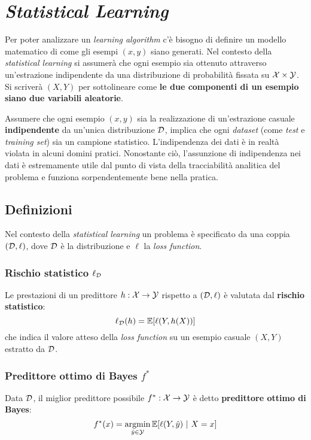 \section{\textit{Statistical Learning}}

Per poter analizzare un \textit{learning algorithm} c'è bisogno di definire un 
modello matematico di come gli esempi $(x,y)$ siano generati. Nel contesto della
\textit{statistical learning} si assumerà che ogni esempio sia ottenuto attraverso
un'estrazione indipendente da una distribuzione di probabilità fissata su
$\mathcal{X} \times \mathcal{Y}$. Si scriverà $(X,Y)$ per sottolineare come 
\textbf{le due componenti di un esempio siano due variabili aleatorie}.

Assumere che ogni esempio $(x,y)$ sia la realizzazione di un'estrazione casuale 
\textbf{indipendente} da un'unica distribuzione $\mathcal{D}$, implica che ogni 
\textit{dataset} (come \textit{test} e \textit{training set}) sia un campione
statistico. L'indipendenza dei dati è in realtà violata in alcuni domini pratici.
Nonostante ciò, l'assunzione di indipendenza nei dati è estremamente utile dal
punto di vista della tracciabilità analitica del problema e funziona
sorpendentemente bene nella pratica.

\subsection{Definizioni}
Nel contesto della \textit{statistical learning} un problema è specificato da una
coppia $(\mathcal{D},\ell)$, dove $\mathcal{D}$ è la distribuzione e $\ell$ la \textit{loss function}.

\subsubsection{Rischio statistico \texorpdfstring{$\ell_{\mathcal{D}}$}{lD}}
Le prestazioni di un predittore $h:\mathcal{X} \rightarrow \mathcal{Y}$ rispetto a $(\mathcal{D},\ell)$ è 
valutata dal \textbf{rischio statistico}:
$$ \ell_{\mathcal{D}}(h) = \mathbb{E}[\ell(Y,h(X))] $$
che indica il valore atteso della \textit{loss function} su un esempio casuale 
$(X,Y)$ estratto da $\mathcal{D}$.

\subsubsection{Predittore ottimo di Bayes \texorpdfstring{$f^*$}{f*}}
Data $\mathcal{D}$, il miglior predittore possibile $f^*:\mathcal{X} \rightarrow \mathcal{Y}$ è detto 
\textbf{predittore ottimo di Bayes}:
$$ f^*(x) = \operatorname*{argmin}_{\hat{y} \in \mathcal{Y}} \mathbb{E}[\ell(Y,\hat{y})\ | \ X=x] $$

